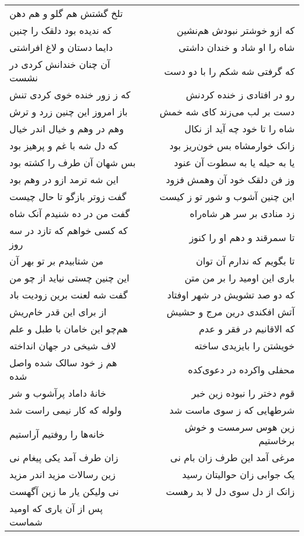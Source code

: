 \begin{center}
\begin{longtable}{l p{0.5cm} r}
تلخ گشتش هم گلو و هم دهن
\\
که ندیده بود دلقک را چنین
&&
که ازو خوشتر نبودش هم‌نشین
\\
دایما دستان و لاغ افراشتی
&&
شاه را او شاد و خندان داشتی
\\
آن چنان خندانش کردی در نشست
&&
که گرفتی شه شکم را با دو دست
\\
که ز زور خنده خوی کردی تنش
&&
رو در افتادی ز خنده کردنش
\\
باز امروز این چنین زرد و ترش
&&
دست بر لب می‌زند کای شه خمش
\\
وهم در وهم و خیال اندر خیال
&&
شاه را تا خود چه آید از نکال
\\
که دل شه با غم و پرهیز بود
&&
زانک خوارمشاه بس خون‌ریز بود
\\
بس شهان آن طرف را کشته بود
&&
یا به حیله یا به سطوت آن عنود
\\
این شه ترمد ازو در وهم بود
&&
وز فن دلقک خود آن وهمش فزود
\\
گفت زوتر بازگو تا حال چیست
&&
این چنین آشوب و شور تو ز کیست
\\
گفت من در ده شنیدم آنک شاه
&&
زد منادی بر سر هر شاه‌راه
\\
که کسی خواهم که تازد در سه روز
&&
تا سمرقند و دهم او را کنوز
\\
من شتابیدم بر تو بهر آن
&&
تا بگویم که ندارم آن توان
\\
این چنین چستی نیاید از چو من
&&
باری این اومید را بر من متن
\\
گفت شه لعنت برین زودیت باد
&&
که دو صد تشویش در شهر اوفتاد
\\
از برای این قدر خام‌ریش
&&
آتش افکندی درین مرج و حشیش
\\
هم‌چو این خامان با طبل و علم
&&
که الاقانیم در فقر و عدم
\\
لاف شیخی در جهان انداخته
&&
خویشتن را بایزیدی ساخته
\\
هم ز خود سالک شده واصل شده
&&
محفلی واکرده در دعوی‌کده
\\
خانهٔ داماد پرآشوب و شر
&&
قوم دختر را نبوده زین خبر
\\
ولوله که کار نیمی راست شد
&&
شرطهایی که ز سوی ماست شد
\\
خانه‌ها را روفتیم آراستیم
&&
زین هوس سرمست و خوش برخاستیم
\\
زان طرف آمد یکی پیغام نی
&&
مرغی آمد این طرف زان بام نی
\\
زین رسالات مزید اندر مزید
&&
یک جوابی زان حوالیتان رسید
\\
نی ولیکن یار ما زین آگهست
&&
زانک از دل سوی دل لا بد رهست
\\
پس از آن یاری که اومید شماست

\end{longtable}
\end{center}
